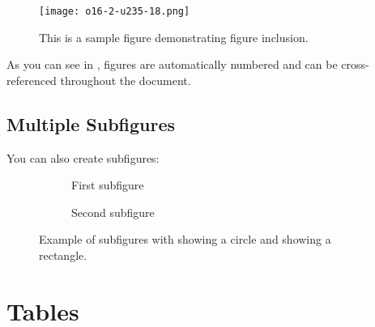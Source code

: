 \documentclass[12pt,a4paper]{article}
\begin{document}
\begin{figure}[H]
    \centering
    \texttt{[image: o16-2-u235-18.png]}


    \caption{This is a sample figure demonstrating figure inclusion.}
    \label{fig:sample-image}
\end{figure}

As you can see in , figures are automatically numbered and can be cross-referenced throughout the document.

\subsection{Multiple Subfigures}

You can also create subfigures:

\begin{figure}[H]
    \centering
    \begin{subfigure}{0.45\textwidth}
        \centering
        \caption{First subfigure}
        \label{fig:sub1}
    \end{subfigure}
    \hfill
    \begin{subfigure}{0.45\textwidth}
        \centering
        \caption{Second subfigure}
        \label{fig:sub2}
    \end{subfigure}
    \caption{Example of subfigures with \protect{} showing a circle and \protect{} showing a rectangle.}
    \label{fig:subfigures}
\end{figure}

\section{Tables}\label{sec:tables}
\end{document}
